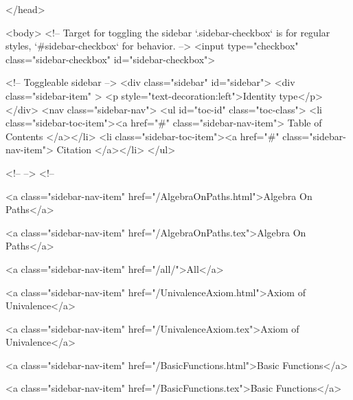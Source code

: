   
</head>




  <body>
    <!-- Target for toggling the sidebar `.sidebar-checkbox` is for regular
     styles, `#sidebar-checkbox` for behavior. -->
<input type="checkbox" class="sidebar-checkbox" id="sidebar-checkbox">

<!-- Toggleable sidebar -->
<div class="sidebar" id="sidebar">
  <div class="sidebar-item" >
    <p style="text-decoration:left">Identity type</p>
  </div>
  <nav class="sidebar-nav">
    <ul id="toc-id" class="toc-class">
  <li class="sidebar-toc-item"><a href="#" class="sidebar-nav-item"> Table of Contents </a></li>
  <li class="sidebar-toc-item"><a href="#" class="sidebar-nav-item"> Citation </a></li>
</ul>


    <!--  -->
    <!-- 
      
    
      
    
      
    
      
        
      
    
      
        
          <a class="sidebar-nav-item" href="/AlgebraOnPaths.html">Algebra On Paths</a>
        
      
    
      
        
          <a class="sidebar-nav-item" href="/AlgebraOnPaths.tex">Algebra On Paths</a>
        
      
    
      
        
          <a class="sidebar-nav-item" href="/all/">All</a>
        
      
    
      
        
          <a class="sidebar-nav-item" href="/UnivalenceAxiom.html">Axiom of Univalence</a>
        
      
    
      
        
          <a class="sidebar-nav-item" href="/UnivalenceAxiom.tex">Axiom of Univalence</a>
        
      
    
      
        
          <a class="sidebar-nav-item" href="/BasicFunctions.html">Basic Functions</a>
        
      
    
      
        
          <a class="sidebar-nav-item" href="/BasicFunctions.tex">Basic Functions</a>
        
